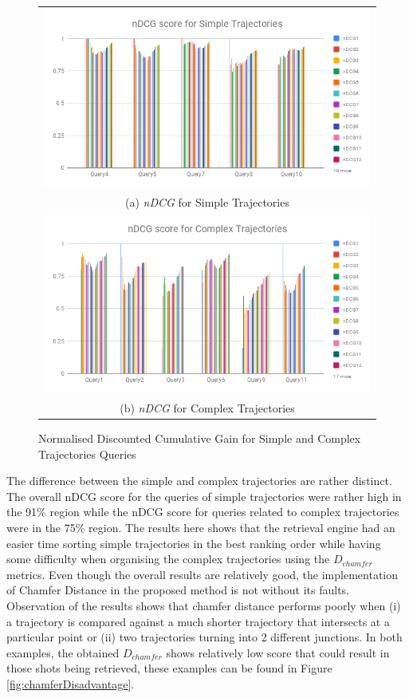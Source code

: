 \begin{figure}[htb!]
  \centering
\begin{tabular}{c}
 \includegraphics[width=0.9\linewidth]{image/retrievalTwo/ndcgSimple.png}\\
 (a) \textit{nDCG} for Simple Trajectories \\
 \includegraphics[width=0.9\linewidth]{image/retrievalTwo/ndcgComplex.png} \\
 (b) \textit{nDCG} for Complex Trajectories
\end{tabular}
\caption{Normalised Discounted Cumulative Gain for Simple and Complex Trajectories Queries} \label{fig:versionTwoNDCG}
\end{figure}

The difference between the simple and complex trajectories are rather distinct. The overall nDCG score for the queries of simple trajectories were rather high in the 91\% region while the nDCG score for queries related to complex trajectories were in the 75\% region. The results here shows that the retrieval engine had an easier time sorting simple trajectories in the best ranking order while having some difficulty when organising the complex trajectories using the $D_{chamfer}$ metrics. Even though the overall results are relatively good, the implementation of Chamfer Distance in the proposed method is not without its faults. Observation of the results shows that chamfer distance performs poorly when (i) a trajectory is compared against a much shorter trajectory that intersects at a particular point or (ii) two trajectories turning into 2 different junctions. In both examples, the obtained $D_{chamfer}$ shows relatively low score that could result in those shots being retrieved, these examples can be found in Figure  \ref{fig:chamferDisadvantage}.


